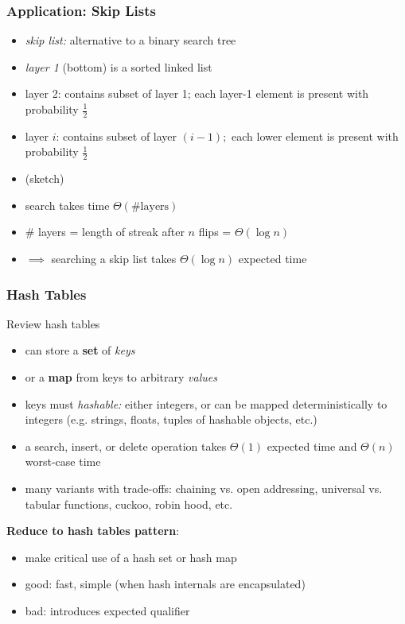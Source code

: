 \documentclass[10pt]{beamer}
\begin{document}
\begin{frame} \frametitle{Application: Skip Lists}
  \begin{itemize}
    \item \emph{skip list:} alternative to a binary search tree
    \item \emph{layer 1} (bottom) is a sorted linked list
    \item layer 2: contains subset of layer 1; each layer-1 element is present
      with probability $\frac{1}{2}$
    \item layer $i$: contains subset of layer $(i-1);$ each lower element is
      present with probability $\frac{1}{2}$
    \item (sketch)
    \item search takes time $\Theta(\text{\# layers})$
    \item \# layers = length of streak after $n$ flips = $\Theta(\log n)$
    \item $\implies$ searching a skip list takes $\Theta(\log n)$ expected time
  \end{itemize}
\end{frame}

\begin{frame} \frametitle{Hash Tables}
Review hash tables
\begin{itemize}
  \item can store a \textbf{set} of \emph{keys}
  \item or a \textbf{map} from keys to arbitrary \emph{values}
  \item keys must \emph{hashable:} either integers, or can be mapped deterministically
    to integers (e.g. strings, floats, tuples of hashable objects, etc.)
  \item a search, insert, or delete operation takes $\Theta(1)$ expected time and
    $\Theta(n)$ worst-case time
  \item many variants with trade-offs: chaining vs. open addressing, universal vs.
    tabular functions, cuckoo, robin hood, etc.
\end{itemize}

\textbf{Reduce to hash tables pattern}:
\begin{itemize}
  \item make critical use of a hash set or hash map
  \item good: fast, simple (when hash internals are encapsulated)
  \item bad: introduces expected qualifier
\end{itemize}
\end{frame}
\end{document}

